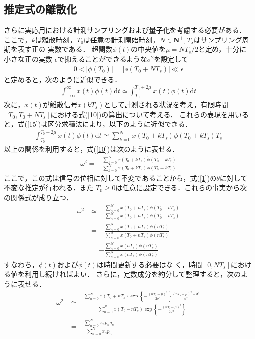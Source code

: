 \documentclass[a4paper,12pt]{jarticle}
\begin{document}
\subsection{推定式の離散化}
さらに実応用における計測サンプリングおよび量子化を考慮する必要がある．
ここで，$k$は離散時刻，$T_0$は任意の計測開始時刻，$N\in\mathbf{N^{+}},T_s$はサンプリング周期を表す正の
実数である．
超関数$\phi(t)$の中央値を$\mu=NT_s/2$と定め，十分に小さな正の実数
$\epsilon$で抑えることができるような$\sigma^2$を設定して
\begin{align}
0< \vert \phi(T_0) \vert=\vert \phi(T_0+NT_s)\vert\ll\epsilon\label{14}
\end{align}
と定めると，次のように近似できる．
\begin{align}
 \int^{\infty}_{-\infty}x(t)\phi(t)\mbox{d}t \simeq 
 \int^{T_0+2\mu}_{T_0}x(t)\phi(t)\mbox{d}t\label{15} 
\end{align}
次に，$x(t)$が離散信号$x(kT_s)$として計測される状況を考え，有限時間
$[T_0,T_0+NT_s]$における式(\ref{10})の算出について考える．
これらの表現を用いると，式(\ref{15})は区分求積法により，以下のように近似できる．
\begin{align}
 \int^{T_0+2\mu}_{T_0} x(t)\phi(t)\mbox{d}t  \simeq
 \sum^{N}_{k=0} x(T_0+kT_s)\phi(T_0+kT_s)T_s\label{16}
\end{align}
以上の関係を利用すると，式(\ref{10})は次のように表せる．
\begin{align}
\omega^2=-\frac{\sum^{N}_{k=0} x(T_0+kT_s)\ddot{\phi}(T_0+kT_s)}{\sum^{N}_{k=0} x(T_0+kT_s)\phi(T_0+kT_s)}\label{17}
\end{align}
ここで，この式は信号の位相に対して不変であることから，式(\ref{1})の$\theta$に対して不変な推定が行われる．また
$T_0\geq0$は任意に設定できる．これらの事実から次の関係式が成り立つ．
\begin{align}
\omega^2&\simeq -\frac{\sum^{N}_{n=0}
 x(T_0+nT_s)\ddot{\phi}(T_0+nT_s)}{\sum^{N}_{n=0}
 x(T_0+nT_s)\phi(T_0+nT_s)}\nonumber\\
&=-\frac{\sum^{N}_{n=0}
 x(T_0+nT_s)\ddot{\phi}(nT_s)}{\sum^{N}_{n=0}
 x(T_0+nT_s)\phi(nT_s)}\nonumber\\
&=-\frac{\sum^{N}_{n=0}
 x(nT_s)\ddot{\phi}(nT_s)}{\sum^{N}_{n=0}
 x(nT_s)\phi(nT_s)}\label{18}
\end{align}
すなわち，$\phi(t)$および$\ddot{\phi}(t)$は時間更新する必要はな
く，時間$[0, NT_s]$における値を利用し続ければよい．
さらに，定数成分を約分して整理すると，次のように表せる．
\begin{align}
\omega^2&\simeq 
-\frac{\sum^{N}_{n=0}x(T_0+nT_s)
 \exp\left\{-\frac{(nT_s-\mu)^2}{2\sigma^2}\right\}\frac{(nT_s-\mu)^2-\sigma^2}{\sigma^4}}
{\sum^{N}_{n=0}x(T_0+nT_s)
 \exp\left\{-\frac{(nT_s-\mu)^2}{2\sigma^2}\right\}
 }\nonumber\\
 &=-\frac{\sum^{N}_{n=0}x_np_nq_n}{\sum^{N}_{n=0}x_np_n}\label{19}
\end{align}
\end{document}
